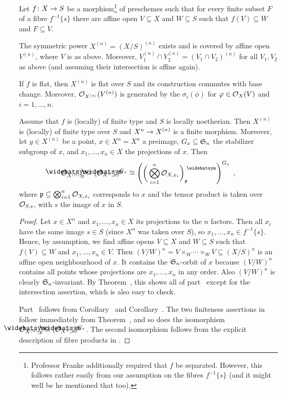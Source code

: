\documentclass[a4paper,parskip=half,numbers=enddot, DIV=12]{scrreprt}
\begin{document}
\begin{prop}
	Let $f\colon X\morphism S$ be a morphism\footnote{Professor Franke additionally required that $f$ be separated. However, this follows rather easily from our assumption on the fibres $f^{-1}\{s\}$ (and it might well be he mentioned that too).} of preschemes such that for every finite subset $F$ of a fibre $f^{-1}\{s\}$ there are affine open $V\subseteq X$ and $W\subseteq S$ such that $f(V)\subseteq W$ and $F\subseteq V$.
	\begin{alphanumerate}
		\item The symmetric power $X^{(n)}=(X/S)^{(n)}$ exists and is covered by affine open $V^{(n)}$, where $V$ is as above. Moreover, $V_1^{(n)}\cap V_2^{(n)}=(V_1\cap V_2)^{(n)}$ for all $V_1,V_2$ as above (and assuming their intersection is affine again).
		\item If $f$ is flat, then $X^{(n)}$ is flat over $S$ and its construction commutes with base change. Moreover, $\mathcal{O}_{X^{(n)}}(V^{(n)})$ is generated by the $\sigma_i(\phi)$ for $\varphi\in\mathcal{O}_X(V)$ and $i=1,\ldots,n$.
		\item Assume that $f$ is (locally) of finite type and $S$ is locally noetherian. Then $X^{(n)}$ is (locally) of finite type over $S$ and $X^n\morphism X^{(n)}$ is a finite morphism. Moreover, let $y\in X^{(n)}$ be a point, $x\in X^n=X^n$ a preimage, $G_x\subseteq \mathfrak{S}_n$ the stabilizer subgroup of $x$, and $x_1,\ldots,x_n\in X$ the projections of $x$. Then
		\begin{align*}
			\roof{\Oo}_{X^{(n)},y}\cong (\roof{\Oo}_{X^n,x})^{G_x}\cong \left(\bigg(\bigotimes_{i=1}^n\Oo_{X,x_i}\bigg)_\pp^\complete\right)^{G_x}\;,
		\end{align*}
		where $\mathfrak{p}\subseteq \bigotimes_{i=1}^n\mathcal{O}_{X,x_i}$ corresponds to $x$ and the tensor product is taken over $\mathcal{O}_{S,s}$, with $s$ the image of $x$ in $S$.
	\end{alphanumerate}
\end{prop}
\begin{proof}
	Let $x\in X^n$ and $x_1,\ldots,x_n\in X$ its projections to the $n$ factors. Then all $x_i$ have the same image $s\in S$ (since $X^n$ was taken over $S$), so $x_1,\ldots,x_n\in f^{-1}\{s\}$. Hence, by assumption, we find affine opens $V\subseteq X$ and $W\subseteq S$ such that $f(V)\subseteq W$ and $x_1,\ldots,x_n\in V$. Then $(V/W)^n=V\times_W\cdots\times_WV\subseteq (X/S)^n$ is an affine open neighbourhood of $x$. It contains the $\mathfrak{S}_n$-orbit of $x$ because $(V/W)^n$ contains all points whose projections are $x_1,\ldots,x_n$ in any order. Also $(V/W)^n$ is clearly $\mathfrak{S}_n$-invariant. By Theorem~, this shows all of part~ except for the intersection assertion, which is also easy to check.
	
	Part~ follows from Corollary~ and Corollary~. The two finiteness assertions in  follow immediately from Theorem~, and so does the isomorphism $\roof{\Oo}_{X^{(n)},y}\cong (\roof{\Oo}_{X^n,x})^{G_x}$. The second isomorphism follows from the explicit description of fibre products in \cite[Proposition~1.3.2]{alggeo2}.
\end{proof}
\end{document}
